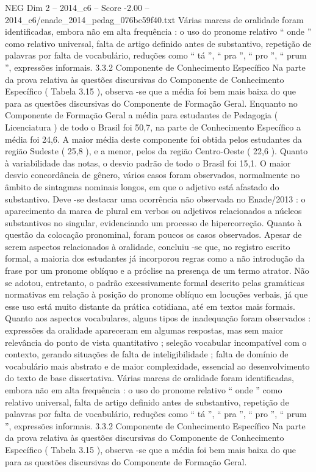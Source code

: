 \begin{textsample}{NEG Dim 2 – 2014\_c6 – Score -2.00 – 2014\_c6/enade\_2014\_pedag\_076bc59f40.txt}
Várias marcas de oralidade foram identificadas, embora não em alta frequência : o uso do pronome relativo “ onde ” como relativo universal, falta de artigo definido antes de substantivo, repetição de palavras por falta de vocabulário, reduções como “ tá ”, “ pra ”, “ pro ”, “ prum ”, expressões informais. 3.3.2 Componente de Conhecimento Específico Na parte da prova relativa às questões discursivas do Componente de Conhecimento Específico ( Tabela 3.15 ), observa -se que a média foi bem mais baixa do que para as questões discursivas do Componente de Formação Geral.
Enquanto no Componente de Formação Geral a média para estudantes de Pedagogia ( Licenciatura ) de todo o Brasil foi 50,7, na parte de Conhecimento Específico a média foi 24,6.
A maior média deste componente foi obtida pelos estudantes da região Sudeste ( 25,8 ), e a menor, pelos da região Centro-Oeste ( 22,6 ).
Quanto à variabilidade das notas, o desvio padrão de todo o Brasil foi 15,1.
O maior desvio concordância de gênero, vários casos foram observados, normalmente no âmbito de sintagmas nominais longos, em que o adjetivo está afastado do substantivo.
Deve -se destacar uma ocorrência não observada no Enade/2013 : o aparecimento da marca de plural em verbos ou adjetivos relacionados a núcleos substantivos no singular, evidenciando um processo de hipercorreção.
Quanto à questão da colocação pronominal, foram poucos os casos observados.
Apesar de serem aspectos relacionados à oralidade, concluiu -se que, no registro escrito formal, a maioria dos estudantes já incorporou regras como a não introdução da frase por um pronome oblíquo e a próclise na presença de um termo atrator.
Não se adotou, entretanto, o padrão excessivamente formal descrito pelas gramáticas normativas em relação à posição do pronome oblíquo em locuções verbais, já que esse uso está muito distante da prática cotidiana, até em textos mais formais.
Quanto aos aspectos vocabulares, alguns tipos de inadequação foram observados : expressões da oralidade apareceram em algumas respostas, mas sem maior relevância do ponto de vista quantitativo ; seleção vocabular incompatível com o contexto, gerando situações de falta de inteligibilidade ; falta de domínio de vocabulário mais abstrato e de maior complexidade, essencial ao desenvolvimento do texto de base dissertativa.
Várias marcas de oralidade foram identificadas, embora não em alta frequência : o uso do pronome relativo “ onde ” como relativo universal, falta de artigo definido antes de substantivo, repetição de palavras por falta de vocabulário, reduções como “ tá ”, “ pra ”, “ pro ”, “ prum ”, expressões informais. 3.3.2 Componente de Conhecimento Específico Na parte da prova relativa às questões discursivas do Componente de Conhecimento Específico ( Tabela 3.15 ), observa -se que a média foi bem mais baixa do que para as questões discursivas do Componente de Formação Geral.

\end{textsample}
